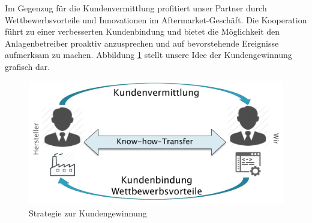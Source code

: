 Im Gegenzug für die Kundenvermittlung profitiert unser Partner durch Wettbewerbsvorteile und Innovationen im Aftermarket-Geschäft. Die Kooperation führt zu einer verbesserten Kundenbindung und bietet die Möglichkeit den Anlagenbetreiber proaktiv anzusprechen und auf bevorstehende Ereignisse aufmerksam zu machen. Abbildung \ref{fig:Kundengewinnung} stellt unsere Idee der Kundengewinnung grafisch dar.

\vspace{1cm}
\begin{figure}[H]
\centering
\includegraphics[width=0.7\linewidth]{Bilder/Kundengewinnung}
\caption{Strategie zur Kundengewinnung}
\label{fig:Kundengewinnung}
\end{figure}
